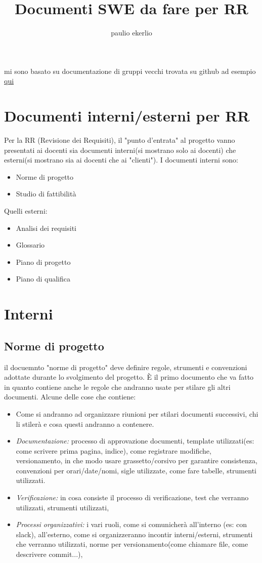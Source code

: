 \documentclass[a4paper]{article}
\title{Documenti SWE da fare per RR}
\author{paulio ekerlio}
\begin{document}
\maketitle
mi sono basato su documentazione di gruppi vecchi trovata su github ad esempio \href{https://github.com/DigitalCookiesGroup/Documents}{qui} 


\section{Documenti interni/esterni per RR}
Per la RR (Revisione dei Requisiti), il "punto d'entrata" al progetto vanno presentati ai docenti sia documenti interni(si mostrano solo ai docenti) che esterni(si mostrano sia ai docenti che ai "clienti").
I documenti interni sono:
\begin{itemize}
\item Norme di progetto
\item Studio di fattibilità
\end{itemize}
Quelli esterni:
\begin{itemize}
\item Analisi dei requisiti
\item Glossario
\item Piano di progetto
\item Piano di qualifica
\end{itemize}


\section{Interni}

\subsection{Norme di progetto}

il docuemnto "norme di progetto" deve definire regole, strumenti e convenzioni adottate durante lo svolgimento del progetto. È il primo documento che va fatto in quanto contiene anche le regole che andranno usate per stilare gli altri documenti.
Alcune delle cose che contiene:
\begin{itemize}
\item Come si andranno ad organizzare riunioni per stilari documenti successivi, chi li stilerà e cosa questi andranno a contenere.
\item \emph{Documentazione:} processo di approvazione documenti, template utilizzati(es: come scrivere prima pagina, indice), come registrare modifiche, versionamento, in che modo usare grassetto/corsivo per garantire consistenza, convenzioni per orari/date/nomi, sigle utilizzate, come fare tabelle, strumenti utilizzati.
\item \emph{Verificazione:} in cosa consiste il processo di verificazione, test che verranno utilizzati, strumenti utilizzati,   
\item \emph{Processi organizzativi:} i vari ruoli, come si comunicherà all'interno (es: con slack), all'esterno, come si organizzeranno incontir interni/esterni, strumenti che verranno utilizzati, norme per versionamento(come chiamare file, come descrivere commit...), 
\end{itemize}
\end{document}
